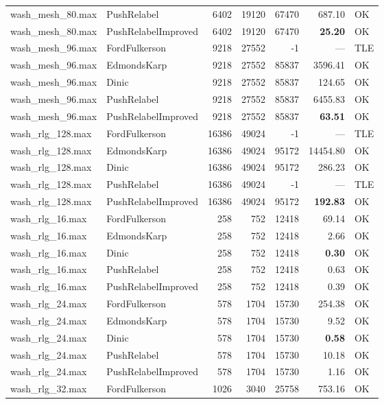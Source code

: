 \begin{longtable}{llrrrrl}
wash\_mesh\_80.max & PushRelabel & 6402 & 19120 & 67470 & 687.10 & OK \\
wash\_mesh\_80.max & PushRelabelImproved & 6402 & 19120 & 67470 & \textbf{25.20} & OK \\
\midrule
wash\_mesh\_96.max & FordFulkerson & 9218 & 27552 & -1 & --- & TLE \\
wash\_mesh\_96.max & EdmondsKarp & 9218 & 27552 & 85837 & 3596.41 & OK \\
wash\_mesh\_96.max & Dinic & 9218 & 27552 & 85837 & 124.65 & OK \\
wash\_mesh\_96.max & PushRelabel & 9218 & 27552 & 85837 & 6455.83 & OK \\
wash\_mesh\_96.max & PushRelabelImproved & 9218 & 27552 & 85837 & \textbf{63.51} & OK \\
\midrule
wash\_rlg\_128.max & FordFulkerson & 16386 & 49024 & -1 & --- & TLE \\
wash\_rlg\_128.max & EdmondsKarp & 16386 & 49024 & 95172 & 14454.80 & OK \\
wash\_rlg\_128.max & Dinic & 16386 & 49024 & 95172 & 286.23 & OK \\
wash\_rlg\_128.max & PushRelabel & 16386 & 49024 & -1 & --- & TLE \\
wash\_rlg\_128.max & PushRelabelImproved & 16386 & 49024 & 95172 & \textbf{192.83} & OK \\
\midrule
wash\_rlg\_16.max & FordFulkerson & 258 & 752 & 12418 & 69.14 & OK \\
wash\_rlg\_16.max & EdmondsKarp & 258 & 752 & 12418 & 2.66 & OK \\
wash\_rlg\_16.max & Dinic & 258 & 752 & 12418 & \textbf{0.30} & OK \\
wash\_rlg\_16.max & PushRelabel & 258 & 752 & 12418 & 0.63 & OK \\
wash\_rlg\_16.max & PushRelabelImproved & 258 & 752 & 12418 & 0.39 & OK \\
\midrule
wash\_rlg\_24.max & FordFulkerson & 578 & 1704 & 15730 & 254.38 & OK \\
wash\_rlg\_24.max & EdmondsKarp & 578 & 1704 & 15730 & 9.52 & OK \\
wash\_rlg\_24.max & Dinic & 578 & 1704 & 15730 & \textbf{0.58} & OK \\
wash\_rlg\_24.max & PushRelabel & 578 & 1704 & 15730 & 10.18 & OK \\
wash\_rlg\_24.max & PushRelabelImproved & 578 & 1704 & 15730 & 1.16 & OK \\
\midrule
wash\_rlg\_32.max & FordFulkerson & 1026 & 3040 & 25758 & 753.16 & OK \\

\end{longtable}
